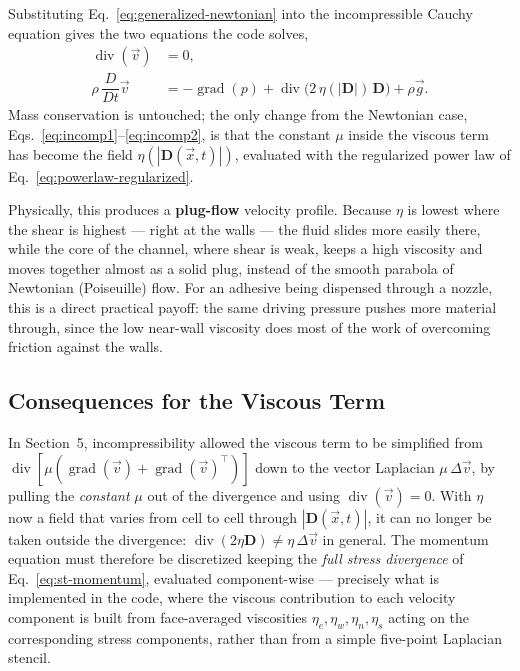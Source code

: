 \documentclass[11pt]{article}
\newcommand{\vv}{\vec{v}}
\newcommand{\vx}{\vec{x}}
\newcommand{\vg}{\vec{g}}
\newcommand{\DDt}{\dfrac{D}{Dt}}
\begin{document}
Substituting Eq.~\eqref{eq:generalized-newtonian} into the incompressible Cauchy equation gives the two equations the code solves,
\begin{align}
  \operatorname{div}(\vv) &= 0, \label{eq:st-continuity}\\
  \rho\,\DDt\vv &= -\operatorname{grad}(p) + \operatorname{div}\!\big(2\,\eta(|\mathbf{D}|)\,\mathbf{D}\big) + \rho\vg. \label{eq:st-momentum}
\end{align}
Mass conservation is untouched; the only change from the Newtonian case, Eqs.~\eqref{eq:incomp1}--\eqref{eq:incomp2}, is that the constant $\mu$ inside the viscous term has become the field $\eta(|\mathbf{D}(\vx,t)|)$, evaluated with the regularized power law of Eq.~\eqref{eq:powerlaw-regularized}.

Physically, this produces a \textbf{plug-flow} velocity profile. Because $\eta$ is lowest where the shear is highest — right at the walls — the fluid slides more easily there, while the core of the channel, where shear is weak, keeps a high viscosity and moves together almost as a solid plug, instead of the smooth parabola of Newtonian (Poiseuille) flow. For an adhesive being dispensed through a nozzle, this is a direct practical payoff: the same driving pressure pushes more material through, since the low near-wall viscosity does most of the work of overcoming friction against the walls.

\subsection{Consequences for the Viscous Term}

In Section~5, incompressibility allowed the viscous term to be simplified from $\operatorname{div}[\mu(\operatorname{grad}(\vv)+\operatorname{grad}(\vv)^\top)]$ down to the vector Laplacian $\mu\,\Delta\vv$, by pulling the \emph{constant} $\mu$ out of the divergence and using $\operatorname{div}(\vv)=0$. With $\eta$ now a field that varies from cell to cell through $|\mathbf{D}(\vx,t)|$, it can no longer be taken outside the divergence: $\operatorname{div}(2\eta\mathbf{D}) \neq \eta\,\Delta\vv$ in general. The momentum equation must therefore be discretized keeping the \emph{full stress divergence} of Eq.~\eqref{eq:st-momentum}, evaluated component-wise — precisely what is implemented in the code, where the viscous contribution to each velocity component is built from face-averaged viscosities $\eta_e,\eta_w,\eta_n,\eta_s$ acting on the corresponding stress components, rather than from a simple five-point Laplacian stencil.
\end{document}
